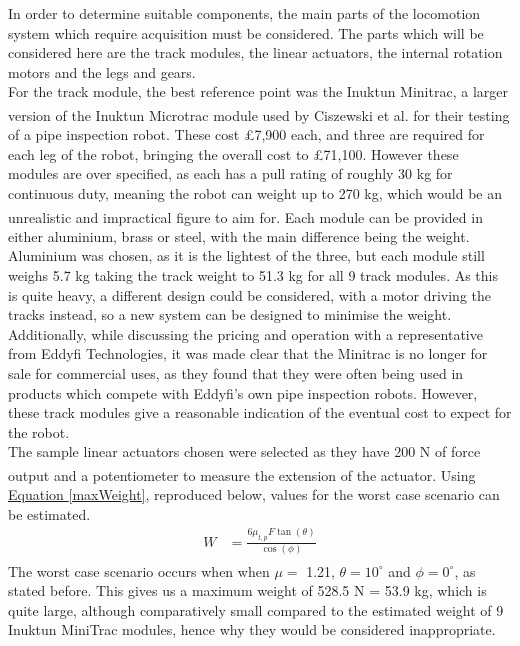 \documentclass[11pt]{article}		%
\newcommand{\supercite}[1]{\textsuperscript{\cite{#1}}}		%
\newcommand{\equationref}[1]{\hyperref[#1]{Equation \ref*{#1}}}     %
\begin{document}
		In order to determine suitable components, the main parts of the locomotion system which require acquisition must be considered.
		The parts which will be considered here are the track modules, the linear actuators, the internal rotation motors and the legs and gears.
		\\
		For the track module, the best reference point was the Inuktun Minitrac, a larger version of the Inuktun Microtrac module used by Ciszewski et al.\supercite{ciszewski2015design} for their testing of a pipe inspection robot.
		These cost £7,900 each, and three are required for each leg of the robot, bringing the overall cost to £71,100.
		However these modules are over specified, as each has a pull rating of roughly 30 kg for continuous duty, meaning the robot can weight up to 270 kg, which would be an unrealistic and impractical figure to aim for\supercite{inuktunTracks}.
		Each module can be provided in either aluminium, brass or steel, with the main difference being the weight.
		Aluminium was chosen, as it is the lightest of the three, but each module still weighs 5.7 kg taking the track weight to 51.3 kg for all 9 track modules.
		As this is quite heavy, a different design could be considered, with a motor driving the tracks instead, so a new system can be designed to minimise the weight.
		Additionally, while discussing the pricing and operation with a representative from Eddyfi Technologies, it was made clear that the Minitrac is no longer for sale for commercial uses, as they found that they were often being used in products which compete with Eddyfi's own pipe inspection robots.
		However, these track modules give a reasonable indication of the eventual cost to expect for the robot.
		\\
		The sample linear actuators chosen were selected as they have 200 N of force output and a potentiometer to measure the extension of the actuator\supercite{rsproLinear}.
		Using \equationref{maxWeight}, reproduced below, values for the worst case scenario can be estimated.
		\begin{align*}
			W &= \frac{6 \mu_{t,p} F \tan \left( \theta \right)}{\cos \left( \phi \right)}
		\end{align*}
		The worst case scenario occurs when when $\mu =$ 1.21\supercite{sato2011development}, $\theta = 10^\circ$ and $\phi = 0^\circ$, as stated before.
		This gives us a maximum weight of 528.5 N = 53.9 kg, which is quite large, although comparatively small compared to the estimated weight of 9 Inuktun MiniTrac modules, hence why they would be considered inappropriate.
\end{document}
